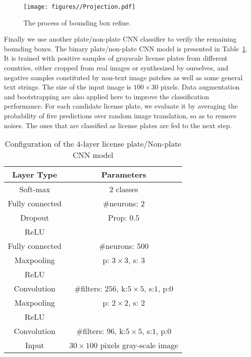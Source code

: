 \documentclass[twocolumn]{svjour3}
\begin{document}
\begin{figure}[tb]
\centering
\texttt{[image: figures//Projection.pdf]}
\caption{The process of bounding box refine.}
\label{Fig:5}
\end{figure}

Finally we use another plate/non-plate CNN classifier to verify the remaining bounding boxes. The binary plate/non-plate CNN model is presented in Table~\ref{Tab:3}.  It is trained with positive samples of grayscale license plates from different countries, either cropped from real images or synthesized by ourselves, and negative samples constituted by non-text image patches as well as some general text strings. The size of the input image is $100 \times 30$ pixels. Data augmentation and bootstrapping are also applied here to improve the classification performance. For each candidate license plate, we evaluate it by averaging the probability of five predictions over random image translation, so as to remove noises. The ones that are classified as license plates are fed to the next step.

\begin{table}[ht]
	\begin{center}
	\caption{Configuration of the $4$-layer license plate/Non-plate CNN model}
	\label{Tab:3}{
	\begin{tabular}{c|c}
	\hline
	 Layer Type & Parameters  \\
	\hline
	Soft-max & $2$ classes \\
	\hline
	Fully connected & \#neurons: $2$ \\
	\hline
	Dropout & Prop: $0.5$ \\
	\hline
	ReLU & \\
	\hline
	Fully connected & \#neurons: $500$ \\
 	\hline
 	Maxpooling & p: $3 \times 3$, s: $3$ \\
   \hline
    ReLU & \\
 	\hline
 	Convolution & \#filters: $256$, k:$5 \times 5$, s:$1$, p:$0$ \\
	\hline
	Maxpooling & p: $2 \times 2$, s: $2$ \\
	\hline
	ReLU & \\
	\hline
	Convolution & \#filters: $96$, k:$5 \times 5$, s:$1$, p:$0$ \\
	\hline
	Input & $30 \times 100$ pixels gray-scale image \\
	\hline
	\end{tabular}
	}

	\end{center}
\end{table}%
\end{document}
